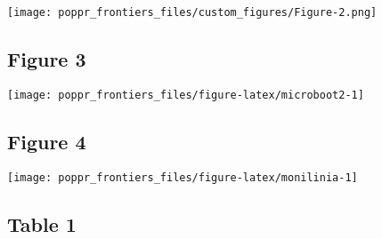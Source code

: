 \documentclass{frontiersSCNS} %
\newenvironment{CodeChunk}{}{}
\begin{document}
\texttt{[image: poppr\_frontiers\_files/custom\_figures/Figure-2.png]}

\subsection*{Figure 3}\label{figure-3}

\begin{CodeChunk}

\texttt{[image: poppr\_frontiers\_files/figure-latex/microboot2-1]} \end{CodeChunk}

\subsection*{Figure 4}\label{figure-4}

\begin{CodeChunk}

\texttt{[image: poppr\_frontiers\_files/figure-latex/monilinia-1]} \end{CodeChunk}

\subsection*{Table 1}\label{table-1}
\end{document}
